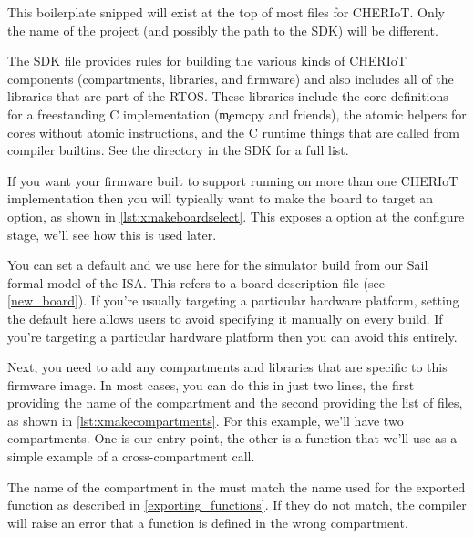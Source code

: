 This boilerplate snipped will exist at the top of most  files for CHERIoT.
Only the name of the project (and possibly the path to the SDK) will be different.

The SDK file provides rules for building the various kinds of CHERIoT components (compartments, libraries, and firmware) and also includes all of the libraries that are part of the RTOS.
These libraries include the core definitions for a freestanding C implementation (\c{memcpy} and friends), the atomic helpers for cores without atomic instructions, and the C runtime things that are called from compiler builtins.
See the  directory in the SDK for a full list.

If you want your firmware built to support running on more than one CHERIoT implementation then you will typically want to make the board to target an option, as shown in \ref{lst:xmakeboardselect}.
This exposes a  option at the configure stage, we'll see how this is used later.

\lualisting[filename=examples/hello_world/xmake.lua,marker=board,label=lst:xmakeboardselect,caption="Build system code for allowing the board to be selected at configure time"]{}

You can set a default and we use  here for the simulator build from our Sail formal model of the ISA.
This refers to a board description file (see \ref{new_board}).
If you're usually targeting a particular hardware platform, setting the default here allows users to avoid specifying it manually on every build.
If you're  targeting a particular hardware platform then you can avoid this entirely.

Next, you need to add any compartments and libraries that are specific to this firmware image.
In most cases, you can do this in just two lines, the first providing the name of the compartment and the second providing the list of files, as shown in \ref{lst:xmakecompartments}.
For this example, we'll have two compartments.
One is our entry point, the other is a function that we'll use as a simple example of a cross-compartment call.

\lualisting[filename=examples/hello_world/xmake.lua,marker=compartments,label=lst:xmakecompartments,caption="Build system code for building compartments"]{}

\begin{caution}
	The name of the compartment in the  must match the name used for the exported function as described in \ref{exporting_functions}.
	If they do not match, the compiler will raise an error that a function is defined in the wrong compartment.
\end{caution}


